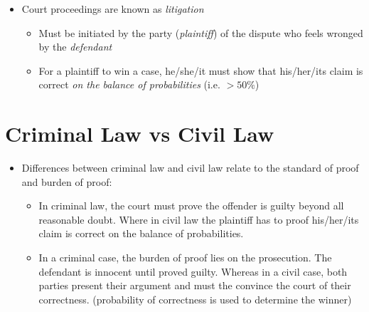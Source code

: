 \documentclass{article}
\begin{document}
\begin{itemize}
\item Court proceedings are known as \emph{litigation}
\begin{itemize}
\item Must be initiated by the party (\emph{plaintiff}) of the dispute who feels wronged by the \emph{defendant}
\item For a plaintiff to win a case, he/she/it must show that his/her/its claim is correct \emph{on the balance of probabilities} (i.e. $> 50\%$)
\end{itemize}
\end{itemize}



\section{Criminal Law vs Civil Law}
\begin{itemize}
\item Differences between criminal law and civil law relate to the standard of proof and burden of proof:
\begin{itemize}
\item In criminal law, the court must prove the offender is guilty beyond all reasonable doubt. Where in civil law the plaintiff has to proof his/her/its claim is correct on the balance of probabilities.
\item In a criminal case, the burden of proof lies on the prosecution. The defendant is innocent until proved guilty. Whereas in a civil case, both parties present their argument and must the convince the court of their correctness. (probability of correctness is used to determine the winner)
\end{itemize}
\end{itemize}
\end{document}
